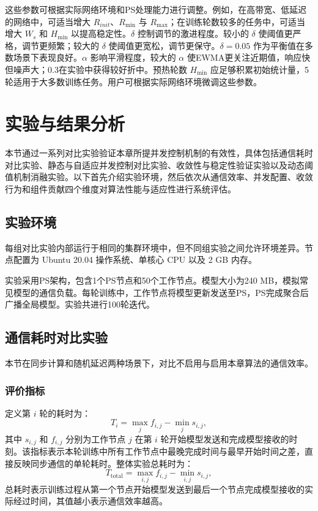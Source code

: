 \documentclass[master, vlined]{DissertUESTC}
\begin{document}
	这些参数可根据实际网络环境和PS处理能力进行调整。例如，在高带宽、低延迟的网络中，可适当增大 $R_{init}$、$R_{\min}$ 与 $R_{\max}$；在训练轮数较多的任务中，可适当增大 $W_s$ 和 $H_{\min}$ 以提高稳定性。$\delta$ 控制调节的激进程度。较小的 $\delta$ 使阈值更严格，调节更频繁；较大的 $\delta$ 使阈值更宽松，调节更保守。$\delta=0.05$ 作为平衡值在多数场景下表现良好。$\alpha$ 影响平滑程度，较大的 $\alpha$ 使EWMA更关注近期值，响应快但噪声大；0.3在实验中获得较好折中。预热轮数 $H_{\min}$ 应足够积累初始统计量，5轮适用于大多数训练任务。用户可根据实际网络环境微调这些参数。

	\section{实验与结果分析}
	\label{sec:tcp-experiments}

	本节通过一系列对比实验验证本章所提并发控制机制的有效性，具体包括通信耗时对比实验、静态与自适应并发控制对比实验、收敛性与稳定性验证实验以及动态阈值机制消融实验。以下首先介绍实验环境，然后依次从通信效率、并发配置、收敛行为和组件贡献四个维度对算法性能与适应性进行系统评估。

	\subsection{实验环境}
	\label{sec:tcp-exp-env}

	每组对比实验内部运行于相同的集群环境中，但不同组实验之间允许环境差异。节点配置为 Ubuntu 20.04 操作系统、单核心 CPU 以及 2 GB 内存。

	实验采用PS架构，包含1个PS节点和50个工作节点。模型大小为240 MB，模拟常见模型的通信负载。每轮训练中，工作节点将模型更新发送至PS，PS完成聚合后广播全局模型。实验共进行100轮迭代。

	\subsection{通信耗时对比实验}

	本节在同步计算和随机延迟两种场景下，对比不启用与启用本章算法的通信效率。

	\subsubsection{评价指标}

	定义第 $i$ 轮的耗时为：
	\begin{equation}
		T_i = \max_{j} f_{i,j} - \min_{j} s_{i,j},
	\end{equation}
	其中 $s_{i,j}$ 和 $f_{i,j}$ 分别为工作节点 $j$ 在第 $i$ 轮开始模型发送和完成模型接收的时刻。该指标表示本轮训练中所有工作节点中最晚完成时间与最早开始时间之差，直接反映同步通信的单轮耗时。整体实验总耗时为：
	\begin{equation}
		T_{\text{total}} = \max_{i,j} f_{i,j} - \min_{i,j} s_{i,j},
	\end{equation}
	总耗时表示训练过程从第一个节点开始模型发送到最后一个节点完成模型接收的实际经过时间，其值越小表示通信效率越高。
\end{document}
